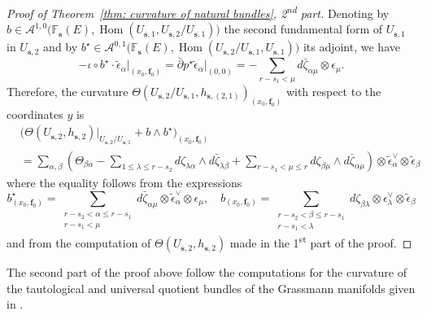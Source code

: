 \documentclass[a4paper]{amsart}
\theoremstyle{plain}%
\theoremstyle{definition}
\theoremstyle{remark}
\newcommand{\FF}{\mathbb{F}}
\begin{document}
\begin{proof}[Proof of Theorem~\ref{thm: curvature of natural bundles}, 2\textsuperscript{nd} part]
	Denoting by $ b \in \mathcal{A}^{1,0}\big( \FF_{\mathbf{s}}(E), \operatorname{Hom}(U_{\mathbf{s},1},U_{\mathbf{s},2} / U_{\mathbf{s},1}) \big) $ the second fundamental form of $ U_{\mathbf{s},1} $ in $ U_{\mathbf{s},2} $ and by $ b^{\star} \in \mathcal{A}^{0,1}\big( \FF_{\mathbf{s}}(E), \operatorname{Hom}(U_{\mathbf{s},2} / U_{\mathbf{s},1},U_{\mathbf{s},1}) \big) $ its adjoint, we have
	\begin{equation*}
		- \iota \circ b^{\star} \cdot \tilde{\epsilon}_\alpha \rvert_{(x_0,\mathbf{f}_0)} = \bar{\partial} p^{\star} \tilde{\epsilon}_\alpha \rvert_{(0,0)} = - \sum_{r-s_1 < \mu} d \bar{\zeta}_{\alpha\mu} \otimes \epsilon_\mu .
	\end{equation*}
	Therefore, the curvature $ \Theta(U_{\mathbf{s},2} / U_{\mathbf{s},1},h_{\mathbf{s},(2,1)})_{(x_0,\mathbf{f}_0)} $ with respect to the coordinates $ y $ is
	\begin{equation*}
		\begin{split}
			& \bigg( \Theta(U_{\mathbf{s},2},h_{\mathbf{s},2}) \big|_{U_{\mathbf{s},2} / U_{\mathbf{s},1}} + b \wedge b^{\star} \bigg)_{(x_0,\mathbf{f}_0)}\\
			&= \sum_{\alpha,\beta}
			\left( \Theta_{\beta\alpha} - \sum_{1 \le \lambda \le r-s_2} d\zeta_{\lambda\alpha} \wedge d\bar{\zeta}_{\lambda\beta} + \sum_{r-s_1 < \mu \le r} d{\zeta}_{\beta\mu} \wedge d\bar{\zeta}_{\alpha\mu} \right) \otimes \tilde{\epsilon}_\alpha^{\vee} \otimes \tilde{\epsilon}_\beta
		\end{split}
	\end{equation*}
	where the equality follows from the expressions
	\begin{equation*}
		b_{(x_0,\mathbf{f}_0)}^{\star} = \sum_{\substack{r-s_2 < \alpha \le r-s_1 \\ r-s_1 < \mu}} d \bar{\zeta}_{\alpha\mu} \otimes \tilde{\epsilon}_\alpha^{\vee} \otimes \epsilon_\mu,
		\quad
		b_{(x_0,\mathbf{f}_0)} = \sum_{\substack{r-s_2 < \beta \le r-s_1 \\ r-s_1 < \lambda}} d {\zeta}_{\beta\lambda} \otimes \epsilon_\lambda^{\vee} \otimes \tilde{\epsilon}_\beta
	\end{equation*}
	and from the computation of $ \Theta(U_{\mathbf{s},2},h_{\mathbf{s},2}) $ made in the 1\textsuperscript{st} part of the proof.
\end{proof}

The second part of the proof above follow the computations for the curvature of the tautological and universal quotient bundles of the Grassmann manifolds given in \cite[\S~16.C]{Dem01}.
\end{document}
